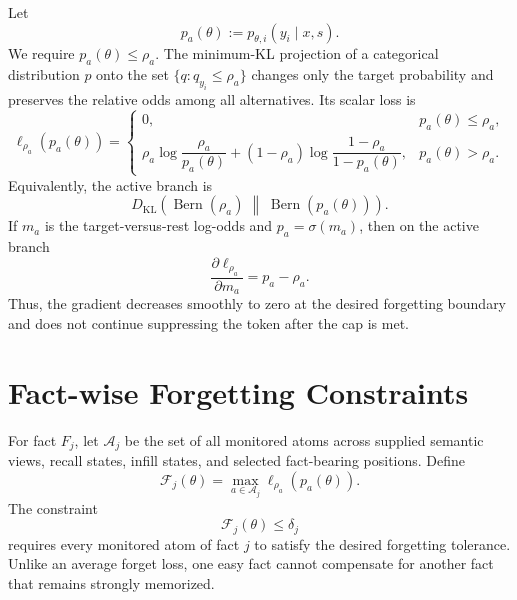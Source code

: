 \documentclass[11pt]{article}
\newcommand{\A}{\mathcal{A}}
\newcommand{\KL}{D_{\mathrm{KL}}}
\newcommand{\Ber}{\operatorname{Bern}}
\begin{document}
Let
\begin{equation}
    p_a(\theta)
    := p_{\theta,i}(y_i\mid x,s).
\end{equation}
We require $p_a(\theta)\leq \rho_a$. The minimum-KL projection of a categorical distribution $p$ onto the set $\{q:q_{y_i}\leq\rho_a\}$ changes only the target probability and preserves the relative odds among all alternatives. Its scalar loss is
\begin{equation}
\label{eq:projection-loss}
    \ell_{\rho_a}\!\left(p_a(\theta)\right)
    =
    \begin{cases}
        0,
        & p_a(\theta)\leq\rho_a, \\
        \rho_a\log\dfrac{\rho_a}{p_a(\theta)}
        +(1-\rho_a)\log\dfrac{1-\rho_a}{1-p_a(\theta)},
        & p_a(\theta)>\rho_a.
    \end{cases}
\end{equation}
Equivalently, the active branch is
\begin{equation}
    \KL\!\left(
        \Ber(\rho_a)
        \;\middle\|\;
        \Ber(p_a(\theta))
    \right).
\end{equation}
If $m_a$ is the target-versus-rest log-odds and $p_a=\sigma(m_a)$, then on the active branch
\begin{equation}
    \frac{\partial \ell_{\rho_a}}{\partial m_a}
    = p_a-\rho_a.
\end{equation}
Thus, the gradient decreases smoothly to zero at the desired forgetting boundary and does not continue suppressing the token after the cap is met.

\section{Fact-wise Forgetting Constraints}

For fact $F_j$, let $\A_j$ be the set of all monitored atoms across supplied semantic views, recall states, infill states, and selected fact-bearing positions. Define
\begin{equation}
\label{eq:fact-constraint}
    \mathcal{F}_j(\theta)
    = \max_{a\in\A_j}
      \ell_{\rho_a}\!\left(p_a(\theta)\right).
\end{equation}
The constraint
\begin{equation}
    \mathcal{F}_j(\theta)\leq\delta_j
\end{equation}
requires every monitored atom of fact $j$ to satisfy the desired forgetting tolerance. Unlike an average forget loss, one easy fact cannot compensate for another fact that remains strongly memorized.
\end{document}
